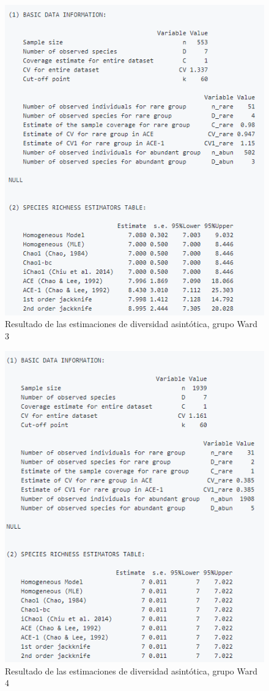 \documentclass[11pt,]{article}
\begin{document}
\begin{figure}
\centering
\includegraphics{asintotico_ward3.png}
\caption{Resultado de las estimaciones de diversidad asintótica, grupo
Ward 3 \label{fig:asintotico_ward3}}
\end{figure}

\begin{figure}
\centering
\includegraphics{asintotico_ward4.png}
\caption{Resultado de las estimaciones de diversidad asintótica, grupo
Ward 4 \label{fig:asintotico_ward4}}
\end{figure}
\end{document}
